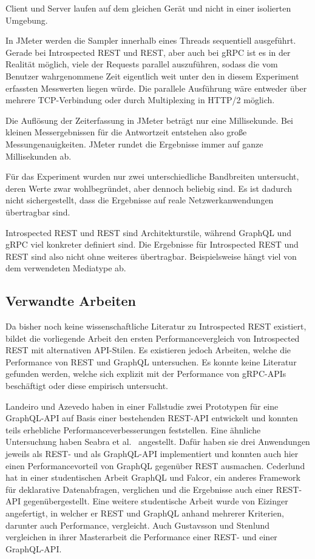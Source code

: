 
Client und Server laufen auf dem gleichen Gerät und nicht in einer isolierten Umgebung.

In JMeter werden die Sampler innerhalb eines Threads sequentiell ausgeführt. Gerade bei Introspected REST und REST, aber auch bei gRPC ist es in der Realität möglich, viele der Requests parallel auszuführen, sodass die vom Benutzer wahrgenommene Zeit eigentlich weit unter den in diesem Experiment erfassten Messwerten liegen würde. Die parallele Ausführung wäre entweder über mehrere TCP-Verbindung oder durch Multiplexing in HTTP/2 möglich.

Die Auflösung der Zeiterfassung in JMeter beträgt nur eine Millisekunde. Bei kleinen Messergebnissen für die Antwortzeit entstehen also große Messungenauigkeiten. JMeter rundet die Ergebnisse immer auf ganze Millisekunden ab.

Für das Experiment wurden nur zwei unterschiedliche Bandbreiten untersucht, deren Werte zwar wohlbegründet, aber dennoch beliebig sind. Es ist dadurch nicht sichergestellt, dass die Ergebnisse auf reale Netzwerkanwendungen übertragbar sind.

Introspected REST und REST sind Architekturstile, während GraphQL und gRPC viel konkreter definiert sind. Die Ergebnisse für Introspected REST und REST sind also nicht ohne weiteres übertragbar. Beispielsweise hängt viel von dem verwendeten Mediatype ab.

\subsection{Verwandte Arbeiten}
Da bisher noch keine wissenschaftliche Literatur zu Introspected REST existiert, bildet die vorliegende Arbeit den ersten Performancevergleich von Introspected REST mit alternativen API-Stilen. Es existieren jedoch Arbeiten, welche die Performance von REST und GraphQL untersuchen. Es konnte keine Literatur gefunden werden, welche sich explizit mit der Performance von gRPC-APIs beschäftigt oder diese empirisch untersucht.

Landeiro und Azevedo \autocite{Landeiro2020} haben in einer Fallstudie zwei Prototypen für eine GraphQL-API auf Basis einer bestehenden REST-API entwickelt und konnten teils erhebliche Performanceverbesserungen feststellen. Eine ähnliche Untersuchung haben Seabra et al.\ \autocite{Seabra2019} angestellt. Dafür haben sie drei Anwendungen jeweils als REST- und als GraphQL-API implementiert und konnten auch hier einen Performancevorteil von GraphQL gegenüber REST ausmachen. Cederlund \autocite{Cederlund2016} hat in einer studentischen Arbeit GraphQL und Falcor, ein anderes Framework für deklarative Datenabfragen, verglichen und die Ergebnisse auch einer REST-API gegenübergestellt. Eine weitere studentische Arbeit wurde von Eizinger \autocite{Eizinger2017} angefertigt, in welcher er REST und GraphQL anhand mehrerer Kriterien, darunter auch Performance, vergleicht. Auch Gustavsson und Stenlund \autocite{Gustavsson2016} vergleichen in ihrer Masterarbeit die Performance einer REST- und einer GraphQL-API.

